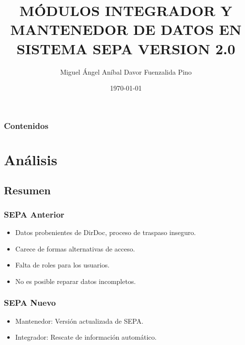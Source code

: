 \documentclass{beamer}
\title[SEPA 2.0]{MÓDULOS INTEGRADOR Y MANTENEDOR DE DATOS EN SISTEMA SEPA VERSION 2.0} %
\author{Miguel Ángel Aníbal Davor Fuenzalida Pino} %
\institute[UTEM] %
{
UNIVERSIDAD TECNOLÓGICA METROPOLITANA \\ %
\medskip
\textit{anibaldavor@gmail.com} %
}
\date{\today} %
\begin{document}
\begin{frame}
\titlepage %
\end{frame}

\begin{frame}
\frametitle{Contenidos} %
\tableofcontents %
\end{frame}


\section{Análisis}

\subsection{Resumen}

\begin{frame}
\frametitle{SEPA Anterior}
\begin{itemize}
\item Datos probenientes de DirDoc, proceso de traspaso inseguro.
\item Carece de formas alternativas de acceso.
\item Falta de roles para los usuarios.
\item No es posible reparar datos incompletos.
\end{itemize}
\end{frame}


\begin{frame}
\frametitle{SEPA Nuevo}
\begin{itemize}
\item Mantenedor: Versión actualizada de SEPA.
\item Integrador: Rescate de información automático.
\end{itemize}
\end{frame}
\end{document}
